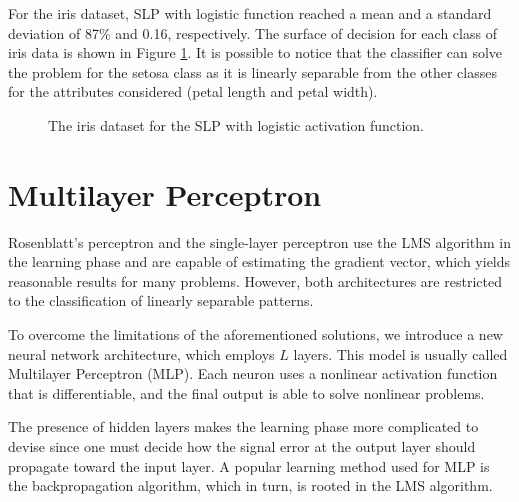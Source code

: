 \documentclass[12pt,a4paper]{article}
\begin{document}
For the iris dataset, SLP with logistic function reached a mean and a standard deviation of 87\% and 0.16, respectively.  The surface of decision for each class of iris data is shown in Figure \ref{fig:iris-decision-surface}. It is possible to notice that the classifier can solve the problem for the setosa class as it is linearly separable from the other classes for the attributes considered (petal length and petal width).

\begin{figure}[H]
    \centering
    

    
    \caption{The iris dataset for the SLP with logistic activation function.}
    \label{fig:iris-decision-surface}
    
\end{figure}

\section{Multilayer Perceptron}

Rosenblatt's perceptron and the single-layer perceptron use the LMS algorithm in the learning phase and are capable of estimating the gradient vector, which yields reasonable results for many problems. However, both architectures are restricted to the classification of linearly separable patterns.

To overcome the limitations of the aforementioned solutions, we introduce a new neural network architecture, which employs \(L\) layers. This model is usually called Multilayer Perceptron (MLP). Each neuron uses a nonlinear activation function that is differentiable, and the final output is able to solve nonlinear problems.

The presence of hidden layers makes the learning phase more complicated to devise since one must decide how the signal error at the output layer should propagate toward the input layer. A popular learning method used for MLP is the backpropagation algorithm, which in turn, is rooted in the LMS algorithm.
\end{document}
